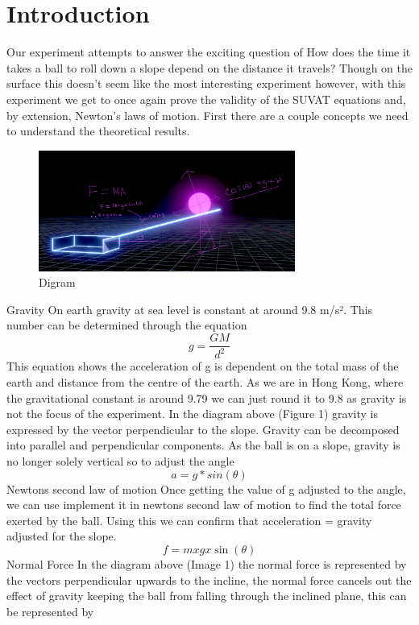 \documentclass[12pt]{report}
\begin{document}
\section{Introduction}
Our experiment attempts to answer the exciting question of How does the time it takes a ball to roll down a slope depend on the distance it travels? Though on the surface this doesn't seem like the most interesting experiment however, with this experiment we get to once again prove the validity of the SUVAT equations and, by extension, Newton's laws of motion. First there are a couple concepts we need to understand the theoretical results.
\begin{figure}
    \centering
    \includegraphics[width=0.75\textwidth]{digram.png}
    \caption{Digram}
\end{figure}
\newline
{\large{Gravity}}
\newline
On earth gravity at sea level is constant at around 9.8 m/s². This number can be determined through the equation
\[g = \frac{GM}{d^2}\]
This equation shows the acceleration of g is dependent on the total mass of the earth and distance from the centre of the earth.  As we are in Hong Kong, where the gravitational constant is around 9.79 we can just round it to 9.8 as gravity is not the focus of the experiment. In the diagram above (Figure 1) gravity is expressed by the vector perpendicular to the slope. Gravity can be decomposed into parallel and perpendicular components. As the ball is on a slope, gravity is no longer solely vertical so to adjust the angle
\[a = g*sin(\theta)\]
{\large{Newtons second law of motion}}
\newline
Once getting the value of g adjusted to the angle, we can use implement it in newtons second law of motion to find the total force exerted by the ball.
Using this we can confirm that acceleration = gravity adjusted for the slope.
\[f = m x g x \sin(\theta)\]
\newline
{\large{Normal Force}}
\newline
In the diagram above (Image 1) the normal force is represented by the vectors perpendicular upwards to the incline, the normal force cancels out the effect of gravity keeping the ball from falling through the inclined plane, this can be represented by
\end{document}
